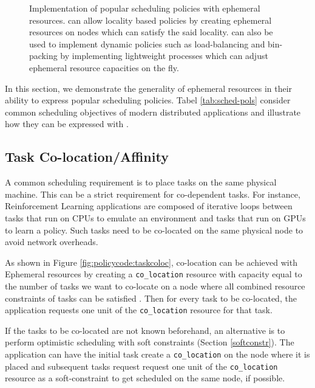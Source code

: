\begin{figure*}[ht]
\caption{Implementation of popular scheduling policies with ephemeral resources. \name{} can allow locality based policies by creating ephemeral resources on nodes which can satisfy the said locality. \name{} can also be used to implement dynamic policies such as load-balancing and bin-packing by implementing lightweight processes which can adjust ephemeral resource capacities on the fly.}
\label{fig:fig}
\end{figure*}


In this section, we demonstrate the generality of ephemeral resources in their ability to express popular scheduling policies. Tabel \ref{tab:sched-pols} consider common scheduling objectives of modern distributed applications and illustrate how they can be expressed with \name{}. 

\subsection{Task Co-location/Affinity}
\label{policies:colocation}
A common scheduling requirement is to place tasks on the same physical machine. This can be a strict requirement for co-dependent tasks. For instance, Reinforcement Learning applications \cite{dqn,gorila} are composed of iterative loops between tasks that run on CPUs to emulate an environment and tasks that run on GPUs to learn a policy. Such tasks need to be co-located on the same physical node to avoid network overheads. 

As shown in Figure \ref{fig:policycode:taskcoloc}, co-location can be achieved with Ephemeral resources by creating a \lstinline{co_location} resource with capacity equal to the number of tasks we want to co-locate on a node where all combined resource constraints of tasks can be satisfied . Then for every task to be co-located, the application requests one unit of the \lstinline{co_location} resource for that task.

If the tasks to be co-located are not known beforehand, an alternative is to perform optimistic scheduling with soft constraints (Section \ref{softconstr}). The application can have the initial task create a \lstinline{co_location} on the node where it is placed and subsequent tasks request request one unit of the \lstinline{co_location} resource as a soft-constraint to get scheduled on the same node, if possible.


